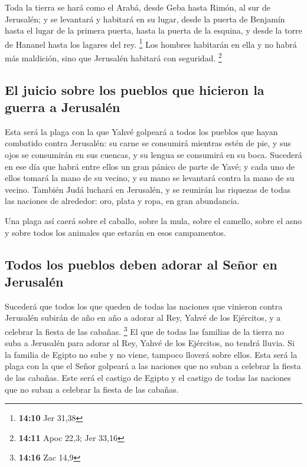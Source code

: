 \begin{paracol}{2}
 Toda la tierra se hará como el Arabá, desde Geba hasta
Rimón, al sur de Jerusalén; y se levantará y habitará en su lugar, desde
la puerta de Benjamín hasta el lugar de la primera puerta, hasta la
puerta de la esquina, y desde la torre de Hananel hasta los lagares del
rey. \footnote{\textbf{14:10} Jer 31,38}  Los hombres
habitarán en ella y no habrá más maldición, sino que Jerusalén habitará
con seguridad. \footnote{\textbf{14:11} Apoc 22,3; Jer 33,16}

\hypertarget{el-juicio-sobre-los-pueblos-que-hicieron-la-guerra-a-jerusaluxe9n}{%
\subsection{El juicio sobre los pueblos que hicieron la guerra a
Jerusalén}\label{el-juicio-sobre-los-pueblos-que-hicieron-la-guerra-a-jerusaluxe9n}}

 Esta será la plaga con la que Yahvé golpeará a todos los
pueblos que hayan combatido contra Jerusalén: su carne se consumirá
mientras estén de pie, y sus ojos se consumirán en sus cuencas, y su
lengua se consumirá en su boca.  Sucederá en ese día que
habrá entre ellos un gran pánico de parte de Yavé; y cada uno de ellos
tomará la mano de su vecino, y su mano se levantará contra la mano de su
vecino.  También Judá luchará en Jerusalén, y se reunirán
las riquezas de todas las naciones de alrededor: oro, plata y ropa, en
gran abundancia.

 Una plaga así caerá sobre el caballo, sobre la mula,
sobre el camello, sobre el asno y sobre todos los animales que estarán
en esos campamentos.

\hypertarget{todos-los-pueblos-deben-adorar-al-seuxf1or-en-jerusaluxe9n}{%
\subsection{Todos los pueblos deben adorar al Señor en
Jerusalén}\label{todos-los-pueblos-deben-adorar-al-seuxf1or-en-jerusaluxe9n}}

 Sucederá que todos los que queden de todas las naciones
que vinieron contra Jerusalén subirán de año en año a adorar al Rey,
Yahvé de los Ejércitos, y a celebrar la fiesta de las cabañas.
\footnote{\textbf{14:16} Zac 14,9}  El que de todas las
familias de la tierra no suba a Jerusalén para adorar al Rey, Yahvé de
los Ejércitos, no tendrá lluvia.  Si la familia de Egipto
no sube y no viene, tampoco lloverá sobre ellos. Esta será la plaga con
la que el Señor golpeará a las naciones que no suban a celebrar la
fiesta de las cabañas.  Este será el castigo de Egipto y
el castigo de todas las naciones que no suban a celebrar la fiesta de
las cabañas.


\end{paracol}
